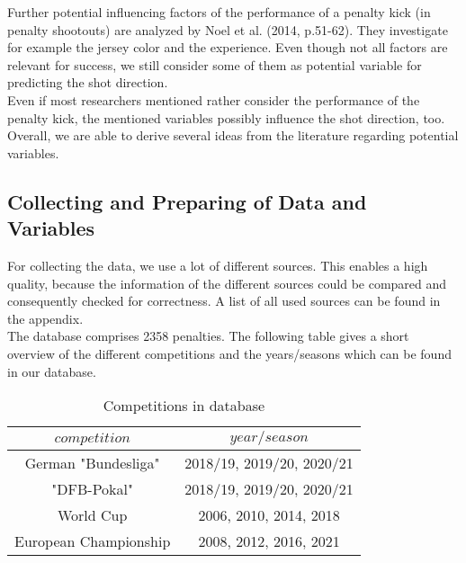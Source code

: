 \documentclass[12pt,dvipsnames]{article}%
\begin{document}
Further potential influencing factors of the performance of a penalty kick (in penalty shootouts) are analyzed by Noel et al. (2014, p.51-62). They investigate for example the jersey color and the experience. Even though not all factors are relevant for success, we still consider some of them as potential variable for predicting the shot direction. \\
Even if most researchers mentioned rather consider the performance of the penalty kick, the mentioned variables possibly influence the shot direction, too. Overall, we are able to derive several ideas from the literature regarding potential variables.


\subsection{Collecting and Preparing of Data and Variables}

For collecting the data, we use a lot of different sources. This enables a high quality, because the information of the different sources could be compared and consequently checked for correctness. A list of all used sources can be found in the appendix.  \\
The database comprises 2358 penalties. The following table gives a short overview of the different competitions and the years/seasons which can be found in our database.

\vspace{+0.3cm}

 \begin{table}[h]
\caption{Competitions in database}
\centering
\begin{tabular}{ c | c }
    $competition$ & $year/season$   \\
   \hline

German "Bundesliga"  & 2018/19, 2019/20, 2020/21 \\

"DFB-Pokal"  & 2018/19, 2019/20, 2020/21 \\

World Cup & 2006, 2010, 2014, 2018 \\   
   
European Championship  & 2008, 2012, 2016, 2021 \\

 \end{tabular}
 \end{table}
 
\end{document}
